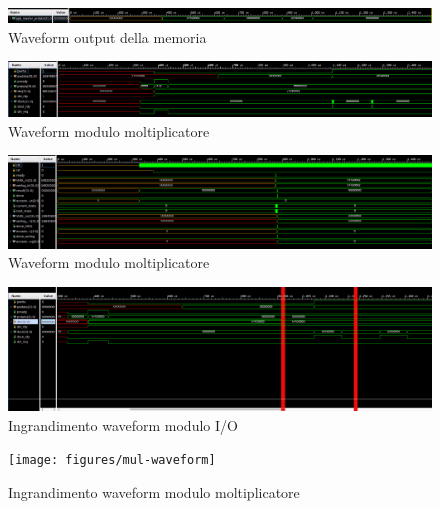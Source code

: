 \documentclass[]{IEEEtran}
\begin{document}
	\begin{figure}[bt]
		\includegraphics[width=\textwidth]{figures/memory-waveform}
		\caption{Waveform output della memoria}
		\label{fig:memory-waveform}
	\end{figure}

	\begin{figure}[bt]
		\includegraphics[width=\textwidth]{figures/io-total}
		\caption{Waveform modulo moltiplicatore}
		\label{fig:io-total}
	\end{figure}

	\begin{figure}[bt]
		\includegraphics[width=\textwidth]{figures/mul-total}
		\caption{Waveform modulo moltiplicatore}
		\label{fig:mul-total}
	\end{figure}
	
	\begin{figure}[bt]
		\includegraphics[width=\textwidth]{figures/io-waveform}
		\caption{Ingrandimento waveform modulo I/O}
		\label{fig:io-waveform}
	\end{figure}
	
	\begin{figure}[bt]
		\texttt{[image: figures/mul-waveform]}
		\caption{Ingrandimento waveform modulo moltiplicatore}
		\label{fig:mul-waveform}
	\end{figure}
	
\end{document}

